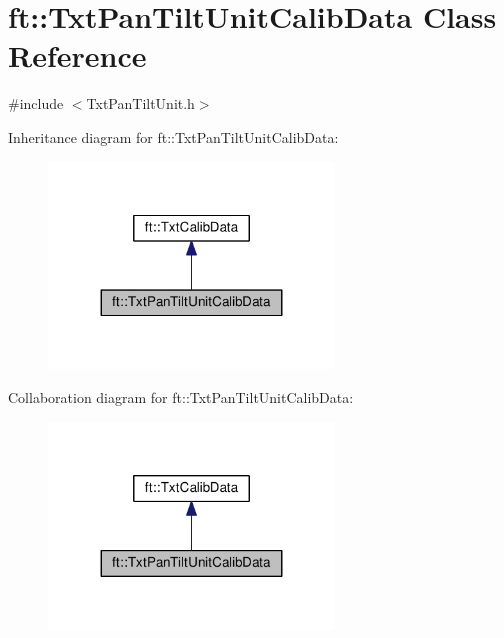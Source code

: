 \hypertarget{classft_1_1_txt_pan_tilt_unit_calib_data}{}\section{ft\+:\+:Txt\+Pan\+Tilt\+Unit\+Calib\+Data Class Reference}
\label{classft_1_1_txt_pan_tilt_unit_calib_data}


{\ttfamily \#include $<$Txt\+Pan\+Tilt\+Unit.\+h$>$}



Inheritance diagram for ft\+:\+:Txt\+Pan\+Tilt\+Unit\+Calib\+Data\+:
\nopagebreak
\begin{figure}[H]
\begin{center}
\leavevmode
\includegraphics[width=215pt]{classft_1_1_txt_pan_tilt_unit_calib_data__inherit__graph}
\end{center}
\end{figure}


Collaboration diagram for ft\+:\+:Txt\+Pan\+Tilt\+Unit\+Calib\+Data\+:
\nopagebreak
\begin{figure}[H]
\begin{center}
\leavevmode
\includegraphics[width=215pt]{classft_1_1_txt_pan_tilt_unit_calib_data__coll__graph}
\end{center}
\end{figure}
